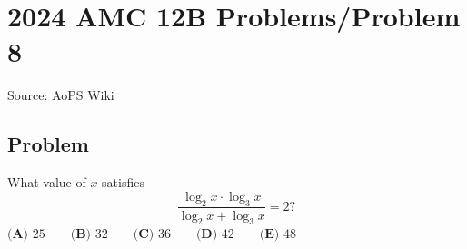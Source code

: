 \documentclass[12pt]{article}
\begin{document}
\section*{{2024 AMC 12B Problems/Problem 8}}
Source: AoPS Wiki

\subsection*{Problem}
What value of $x$ satisfies \[\frac{\log_2x \cdot \log_3x}{\log_2x+\log_3x}=2?\] $\textbf{(A) } 25 \qquad\textbf{(B) } 32 \qquad\textbf{(C) } 36 \qquad\textbf{(D) } 42 \qquad\textbf{(E) } 48$
\end{document}
